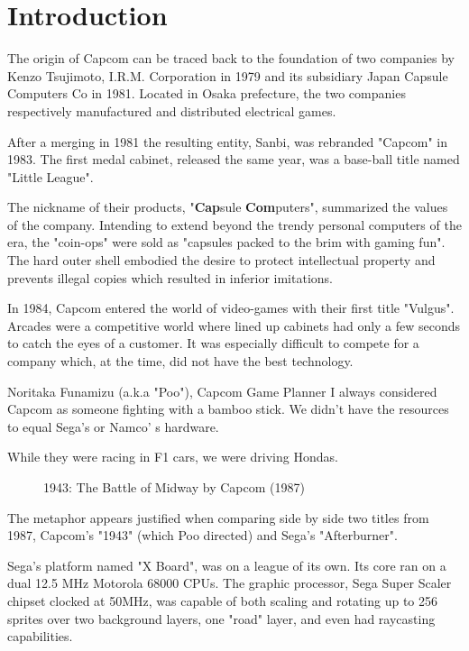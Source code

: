 \chapter{Introduction} 

The origin of Capcom can be traced back to the foundation of two companies by Kenzo Tsujimoto, I.R.M. Corporation in 1979 and its subsidiary Japan Capsule Computers Co in 1981. Located in Osaka prefecture, the two companies respectively manufactured and distributed electrical games.

After a merging in 1981 the resulting entity, Sanbi, was rebranded "Capcom" in 1983. The first medal cabinet, released the same year, was a base-ball title named "Little League".

The nickname of their products, "\textbf{Cap}sule \textbf{Com}puters", summarized the values of the company. Intending to extend beyond the trendy personal computers of the era, the "coin-ops" were sold as "capsules packed to the brim with gaming fun". The hard outer shell embodied the desire to protect intellectual property and prevents illegal copies which resulted in inferior imitations.


 In 1984, Capcom entered the world of video-games with their first title "Vulgus".
Arcades were a competitive world where lined up cabinets had only a few seconds to catch the eyes of a customer. It was especially difficult to compete for a company which, at the time, did not have the best technology.

\begin{q}{Noritaka Funamizu (a.k.a "Poo"), Capcom Game Planner\cite{planner}}
I always considered Capcom as someone fighting with a bamboo stick. We didn't have the resources to equal Sega's or Namco'
s hardware. 

While they were racing in F1 cars, we were driving Hondas.
\end{q}


\begin{figure}[H]
\caption*{1943: The Battle of Midway by Capcom (1987)}
\end{figure}

The metaphor appears justified when comparing side by side two titles from 1987, Capcom's "1943" (which Poo directed) and Sega's "Afterburner".

Sega's platform named "X Board", was on a league of its own. Its core ran on a dual 12.5 MHz Motorola 68000 CPUs. The graphic processor, Sega Super Scaler chipset clocked at 50MHz, was capable of both scaling and rotating up to 256 sprites over two background layers, one "road" layer, and even had raycasting capabilities. 

